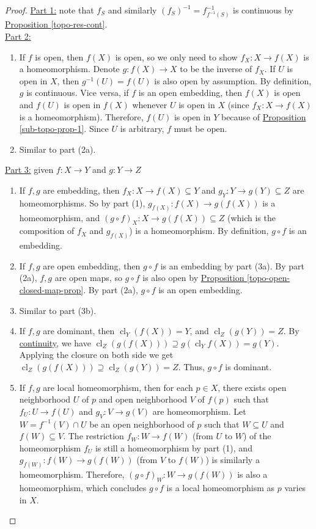 \documentclass{treatise}
\begin{document}
\begin{proof}
\underline{Part 1:} note that $f_S$ and similarly $(f_S)^{-1} = f^{-1}_{f^{-1}(S)}$ is continuous by \hyperref[topo-res-cont]{Proposition \ref*{topo-res-cont}}.
\\
\underline{Part 2:}
\begin{enumerate}[label=(\alph*)]
    \item If $f$ is open, then $f(X)$ is open, so we only need to show $f_X: X \to f(X)$ is a homeomorphism. Denote $g: f(X) \to X$ to be the inverse of $f_X$. If $U$ is open in $X$, then $g^{-1}(U) = f(U)$ is also open by assumption. By definition, $g$ is continuous. Vice versa, if $f$ is an open embedding, then $f(X)$ is open and $f(U)$ is open in $f(X)$ whenever $U$ is open in $X$ (since $f_X: X \to f(X)$ is a homeomorphism). Therefore, $f(U)$ is open in $Y$ because of \hyperref[sub-topo-prop-1]{Proposition \ref*{sub-topo-prop-1}}. Since $U$ is arbitrary, $f$ must be open.
    \item Similar to part (2a).
\end{enumerate}
\underline{Part 3:} given $f: X \to Y$ and $g: Y \to Z$
\begin{enumerate}[label=(\alph*)]
    \item If $f, g$ are embedding, then $f_X : X \to f(X) \subseteq Y$ and $g_Y: Y \to g(Y) \subseteq Z$ are homeomorphisms. So by part (1), $g_{f(X)}: f(X) \to g(f(X))$ is a homeomorphism, and $(g \circ f)_X : X \to g(f(X)) \subseteq Z$ (which is the composition of $f_X$ and $g_{f(X)}$) is a homeomorphism. By definition, $g \circ f$ is an embedding.
    \item If $f, g$ are open embedding, then $g \circ f$ is an embedding by part (3a). By part (2a), $f, g$ are open maps, so $g \circ f$ is also open by \hyperref[topo-open-closed-map-prop]{Proposition \ref*{topo-open-closed-map-prop}}. By part (2a), $g \circ f$ is an open embedding.
    \item Similar to part (3b).
    \item If $f, g$ are dominant, then $\operatorname{cl}_Y (f(X)) = Y$, and $\operatorname{cl}_Z (g(Y)) = Z$. By \hyperref[cont-equiv-def]{continuity}, we have $\operatorname{cl}_Z (g(f(X))) \supseteq g(\operatorname{cl}_Y f(X)) = g(Y)$. Applying the closure on both side we get $\operatorname{cl}_Z (g(f(X))) \supseteq \operatorname{cl}_Z (g(Y)) = Z$. Thus, $g \circ f$ is dominant.
    \item If $f, g$ are local homeomorphism, then for each $p \in X$, there exists open neighborhood $U$ of $p$ and open neighborhood $V$ of $f(p)$ such that $f_U: U \to f(U)$ and $g_V: V \to g(V)$ are homeomorphism. Let $W = f^{-1}(V) \cap U$ be an open neighborhood of $p$ such that $W \subseteq U$ and $f(W) \subseteq V$. The restriction $f_W : W \to f(W)$ (from $U$ to $W$) of the homeomorphism $f_U$ is still a homeomorphism by part (1), and $g_{f(W)} : f(W) \to g(f(W))$ (from $V$ to $f(W)$) is similarly a homeomorphism. Therefore, $(g \circ f)_W : W \to g(f(W))$ is also a homeomorphism, which concludes $g \circ f$ is a local homeomorphism as $p$ varies in $X$.

\end{enumerate}
\end{proof}
\end{document}

